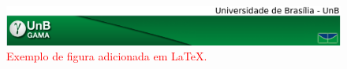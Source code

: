 





\begin{figure}[htpb]
\centering
\includegraphics[width=\textwidth]{figuras/fga.png}
\caption{\textcolor{red}{Exemplo de figura adicionada em \LaTeX.}}
\label{fig:exemplo_fig}
\end{figure}



